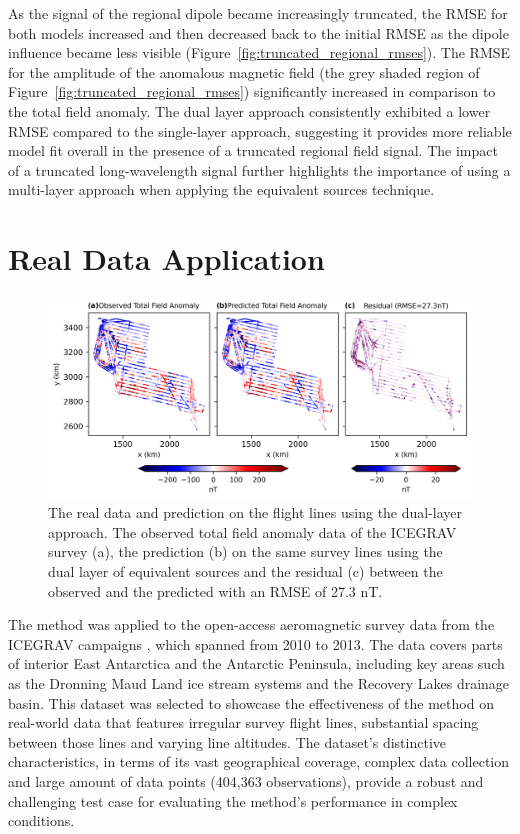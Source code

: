 As the signal of the regional dipole became increasingly truncated, the RMSE for both models increased and then decreased back to the initial RMSE as the dipole influence became less visible (Figure~\ref{fig:truncated_regional_rmses}). The RMSE for the amplitude of the anomalous magnetic field (the grey shaded region of Figure~\ref{fig:truncated_regional_rmses}) significantly increased in comparison to the total field anomaly. The dual layer approach consistently exhibited a lower RMSE compared to the single-layer approach, suggesting it provides more reliable model fit overall in the presence of a truncated regional field signal. The impact of a truncated long-wavelength signal further highlights the importance of using a multi-layer approach when applying the equivalent sources technique.


\section{Real Data Application}
\label{sec:real_application}

\begin{figure}[tb!]
\centering
\includegraphics[width=1\linewidth]{figures/real_line_pred.png}
\caption{
    The real data and prediction on the flight lines using the dual-layer approach. The observed total field anomaly data of the ICEGRAV survey \citep{ICEGRAV_data} (a), the prediction (b) on the same survey lines using the dual layer of equivalent sources and the residual (c) between the observed and the predicted with an RMSE of 27.3 nT.
}
\label{fig:real_line_pred}
\end{figure}

The method was applied to the open-access aeromagnetic survey data from the ICEGRAV campaigns \citep{ICEGRAV_data}, which spanned from 2010 to 2013. The data covers parts of interior East Antarctica and the Antarctic Peninsula, including key areas such as the Dronning Maud Land ice stream systems and the Recovery Lakes drainage basin. This dataset was selected to showcase the effectiveness of the method on real-world data that features irregular survey flight lines, substantial spacing between those lines and varying line altitudes. The dataset’s distinctive characteristics, in terms of its vast geographical coverage, complex data collection and large amount of data points (404,363 observations), provide a robust and challenging test case for evaluating the method's performance in complex conditions.

